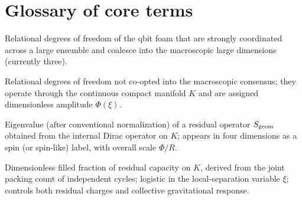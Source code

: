 \documentclass[11pt,a4paper]{article}
\begin{document}
\section{Glossary of core terms}
\label{app:glossary}

\begin{description}[style=nextline,leftmargin=0pt]
\item[Consensus degrees of freedom.] Relational degrees of freedom of the qbit foam that are strongly coordinated across a large ensemble and coalesce into the macroscopic large dimensions (currently three).
\item[Independent relational flux.] Relational degrees of freedom not co-opted into the macroscopic consensus; they operate through the continuous compact manifold \(K\) and are assigned dimensionless amplitude \(\Phi(\xi)\).
\item[Residual geometric charge.] Eigenvalue (after conventional normalization) of a residual operator \(S_{\rm geom}\) obtained from the internal Dirac operator on \(K\); appears in four dimensions as a spin (or spin-like) label, with overall scale \(\Phi/R\).
\item[Packing amplitude \(\Phi(\xi)\).] Dimensionless filled fraction of residual capacity on \(K\), derived from the joint packing count of independent cycles; logistic in the local-separation variable \(\xi\); controls both residual charges and collective gravitational response.
\end{description}
\end{document}
